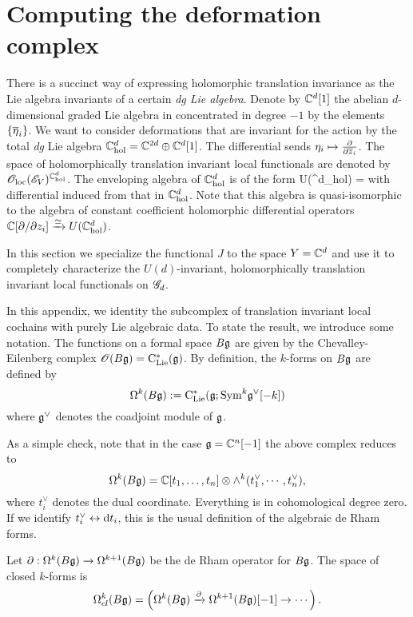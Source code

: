 \appendix

\section{Computing the deformation complex}\label{sec: hol trans}

There is a succinct way of expressing holomorphic translation invariance as the Lie algebra invariants of a certain {\em dg Lie algebra}.
Denote by $\CC^d[1]$ the abelian $d$-dimensional graded Lie algebra in concentrated in degree $-1$ by the elements $\{\Bar{\eta}_i\}$.
We want to consider deformations that are invariant for the action by the total {\em dg} Lie algebra $\CC^{d}_{\rm hol} = \CC^{2d} \oplus \CC^d[1]$.
The differential sends $\eta_i \mapsto \frac{\partial}{\partial \zbar_i}$.
The space of holomorphically translation invariant local functionals are denoted by $\oloc(\sE_V)^{\CC^d_{\rm hol}}$.
The enveloping algebra of $\CC^d_{\rm hol}$ is of the form
\beqn
U(\CC^{d}_{\rm hol}) = \CC {}
\eeqn
with differential induced from that in $\CC^{d}_{\rm hol}$. 
Note that this algebra is quasi-isomorphic to the algebra of constant coefficient holomorphic differential operators $\CC[\partial / \partial z_i] \xto{\simeq} U(\CC^{d}_{\rm hol})$. 

In this section we specialize the functional $J$ to the space $Y = \CC^d$ and use it to completely characterize the $U(d)$-invariant, holomorphically translation invariant local functionals on $\sG_d$. 

In this appendix, we identity the subcomplex of translation invariant local cochains with purely Lie algebraic data.
To state the result, we introduce some notation.
The functions on a formal space $B \fg$ are given by the Chevalley-Eilenberg complex $\sO(B\fg) = \clie^*(\fg)$.
By definition, the $k$-forms on $B\fg$ are defined by
\[
\Omega^k(B \fg) := \clie^*(\fg ; \Sym^k \fg^\vee [-k])
\]
where $\fg^\vee$ denotes the coadjoint module of $\fg$. 

As a simple check, note that in the case $\fg = \CC^n [-1]$ the above complex reduces to
\[
\Omega^k(B \fg) = \CC[t_1,\ldots, t_n] \tensor \wedge^k(t_1^\vee, \cdots, t_n^\vee),
\]
where $t_i^\vee$ denotes the dual coordinate. 
Everything is in cohomological degree zero.
If we identify $t_i^\vee \leftrightarrow \d t_i$, this is the usual definition of the algebraic de Rham forms. 

Let $\partial : \Omega^{k}(B\fg) \to \Omega^{k+1}(B\fg)$ be the de Rham operator for $B\fg$. 
The space of closed $k$-forms is
\[
\Omega^{k}_{cl}(B \fg) = \left( \Omega^k(B\fg) \xto{\partial} \Omega^{k+1}(B \fg)[-1] \to \cdots \right).
\]

